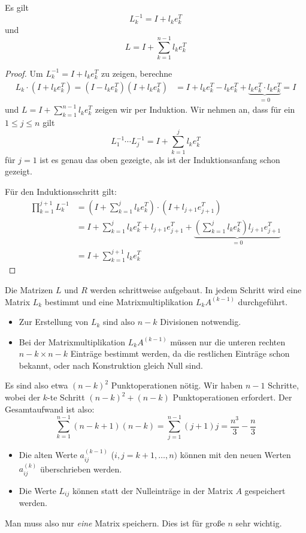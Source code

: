 \documentclass{mycourse}
\begin{document}
\begin{st}
\label{st:3.4}
Es gilt 
\[
L_k^{-1} = I + l_k e_k^T
\]
und
\[
L = I+\sum_{k=1}^{n-1}l_ke_k^T
\]
\begin{proof}
Um $L_k^{-1}=I+l_ke_k^T$ zu zeigen, berechne
\begin{align*}
L_k\cdot (I+l_ke_k^T) =(I-l_ke_k^T)(I+l_ke_k^T) &= I + l_ke_k^T -l_ke_k^T +\underbrace{l_ke_k^T\cdot l_ke_k^T}_{=0} = I
\end{align*}
und $L = I + \sum_{k=1}^{n-1}l_ke_k^T$ zeigen wir per Induktion.
Wir nehmen an, dass für ein $1\le j\le n$ gilt
\[
L_1^{-1}\dotsb L_j^{-1} = I + \sum_{k=1}^j l_ke_k^T
\]
für $j=1$ ist es genau das oben gezeigte, als ist der Induktionsanfang schon gezeigt.

Für den Induktionsschritt gilt:
\begin{align*}
	\prod_{k=1}^{j+1} L_k^{-1} &= \left( I +\sum_{k=1}^j l_ke_k^T\right) \cdot \left( I + l_{j+1}e_{j+1}^T\right)\\
&= I + \sum_{k=1}^j l_ke_k^T + l_{j+1}e_{j+1}^T + \underbrace{\left(\sum_{k=1}^j l_ke_k^T\right)l_{j+1}e_{j+1}^T}_{=0}\\
&= I + \sum_{k=1}^{j+1} l_ke_k^T
\end{align*}
\end{proof}
\end{st}

Die Matrizen $L$ und $R$ werden schrittweise aufgebaut.
In jedem Schritt wird eine Matrix $L_k$ bestimmt und eine Matrixmultiplikation $L_kA^{(k-1)}$ durchgeführt.
\begin{itemize}
\item Zur Erstellung von $L_k$ sind also $n-k$ Divisionen notwendig.
\item Bei der Matrixmultiplikation $L_kA^{(k-1)}$ müssen nur die unteren rechten $n-k\times n-k$ Einträge bestimmt werden,
da die restlichen Einträge schon bekannt, oder nach Konstruktion gleich Null sind.
\end{itemize}
Es sind also etwa $(n-k)^2$ Punktoperationen nötig.
Wir haben $n-1$ Schritte, wobei der $k$-te Schritt $(n-k)^2+(n-k)$ Punktoperationen erfordert.
Der Gesamtaufwand ist also:
\[
\sum_{k=1}^{n-1} (n-k+1)(n-k) = \sum_{j=1}^{n-1}(j+1)j = \frac {n^3}3 - \frac n3
\]

\begin{note}
\begin{itemize}
\item Die alten Werte $a_{ij}^{(k-1)}$ ($i,j=k+1,\dotsc,n)$
können mit den neuen Werten $a_{ij}^{(k)}$ überschrieben werden.
\item Die Werte $L_{ij}$ können statt der Nulleinträge in der Matrix $A$ gespeichert werden.
\end{itemize}
Man muss also nur \emph{eine} Matrix speichern.
Dies ist für große $n$ sehr wichtig.
\end{note}
\end{document}
